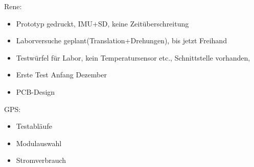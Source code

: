 \documentclass{article}
\begin{document}
Rene:
\begin{itemize}
\item
Prototyp gedruckt, IMU+SD, keine Zeitüberschreitung
\item
Laborversuche geplant(Translation+Drehungen), bis jetzt Freihand
\item
Testwürfel für Labor, kein Temperatursensor etc., Schnittstelle vorhanden,
\item
Erste Test Anfang Dezember
\item
PCB-Design
\end{itemize}

GPS:
\begin{itemize}
\item
Testabläufe
\item
Modulauswahl
\item
Stromverbrauch
\end{itemize}



\end{document}
